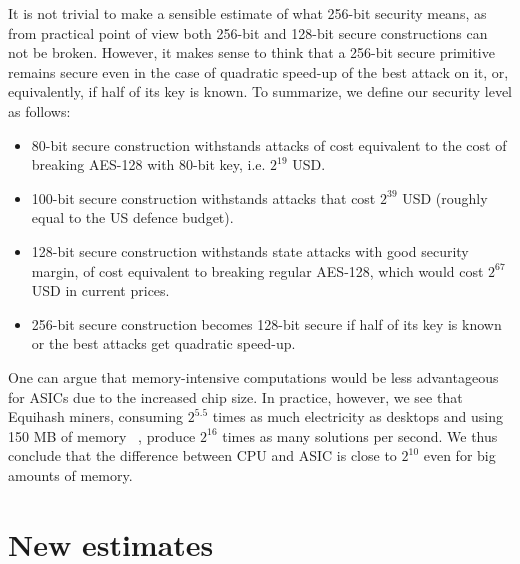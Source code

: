 \documentclass[a4paper]{article}
\begin{document}
It is not trivial to make a sensible estimate of what 256-bit security means, as from practical point of view both 256-bit and 128-bit secure constructions can not be broken. However, it makes sense to think that a 256-bit secure primitive remains secure even in the case of quadratic speed-up of the best attack on it, or, equivalently, if half of its key is known. To summarize, we define our security level as follows:
\begin{itemize}
    \item 80-bit secure construction withstands attacks of cost  equivalent to the cost of breaking AES-128 with 80-bit key, i.e. $2^{19}$ USD.
    \item 100-bit secure construction withstands attacks that cost $2^{39}$ USD (roughly equal to the US defence budget).
    \item 128-bit secure construction withstands state attacks with good security margin, of cost equivalent to breaking regular AES-128, which would cost $2^{67}$ USD in current prices.
    \item 256-bit secure construction becomes 128-bit secure if half of its key is known or the best attacks get quadratic speed-up.
\end{itemize}

One can argue that memory-intensive computations would be less advantageous for ASICs due to the increased chip size. In practice, however, we see that Equihash miners, consuming $2^{5.5}$ times as much electricity as desktops and using 150 MB of memory ~\cite{equihashminer}, produce $2^{16}$ times as many solutions per second. We thus conclude that the difference between CPU and ASIC is close to $2^{10}$ even for big amounts of memory.
 
 
 
 
 \section{New estimates}
 
\end{document}
